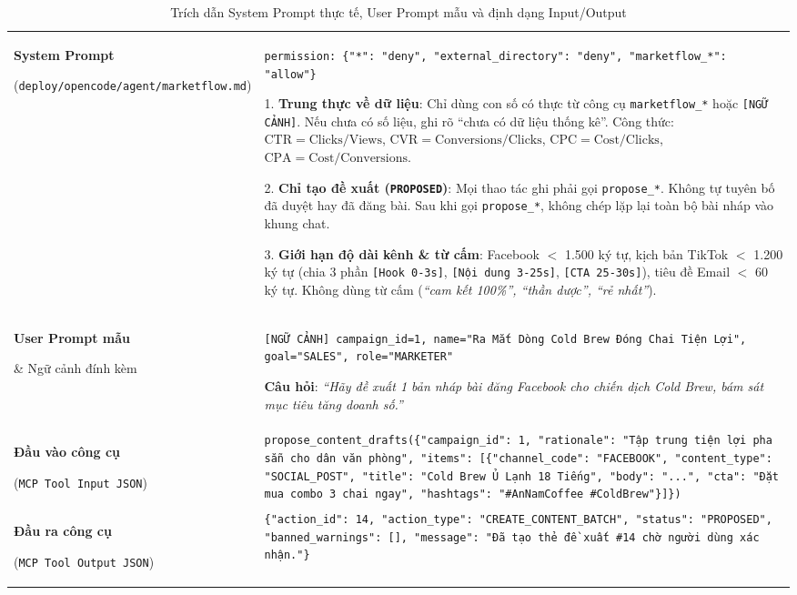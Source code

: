 \begin{table}[!htbp]
\centering
\scriptsize
\renewcommand{\arraystretch}{1.03}
\caption{Trích dẫn System Prompt thực tế, User Prompt mẫu và định dạng Input/Output}
\label{tab:prompt-io-spec}
\begin{tabularx}{\textwidth}{|L{2.9cm}|Y|}
\hline
{} & \\
\hline
\textbf{System Prompt}\par (\texttt{deploy/opencode/\allowbreak agent/marketflow.md}) &
\texttt{permission: \{"*": "deny", "external\_directory": "deny", "marketflow\_*": "allow"\}}\par
1. \textbf{Trung thực về dữ liệu}: Chỉ dùng con số có thực từ công cụ \texttt{marketflow\_*} hoặc \texttt{[NGỮ CẢNH]}. Nếu chưa có số liệu, ghi rõ ``chưa có dữ liệu thống kê''. Công thức: $\text{CTR}=\text{Clicks}/\text{Views}$, $\text{CVR}=\text{Conversions}/\text{Clicks}$, $\text{CPC}=\text{Cost}/\text{Clicks}$, $\text{CPA}=\text{Cost}/\text{Conversions}$.\par
2. \textbf{Chỉ tạo đề xuất (\texttt{PROPOSED})}: Mọi thao tác ghi phải gọi \texttt{propose\_*}. Không tự tuyên bố đã duyệt hay đã đăng bài. Sau khi gọi \texttt{propose\_*}, không chép lặp lại toàn bộ bài nháp vào khung chat.\par
3. \textbf{Giới hạn độ dài kênh \& từ cấm}: Facebook $<$ 1.500 ký tự, kịch bản TikTok $<$ 1.200 ký tự (chia 3 phần \texttt{[Hook 0-3s]}, \texttt{[Nội dung 3-25s]}, \texttt{[CTA 25-30s]}), tiêu đề Email $<$ 60 ký tự. Không dùng từ cấm (\textit{``cam kết 100\%'', ``thần dược'', ``rẻ nhất''}).\\
\hline
\textbf{User Prompt mẫu}\par \& Ngữ cảnh đính kèm &
\texttt{[NGỮ CẢNH] campaign\_id=1, name="Ra Mắt Dòng Cold Brew Đóng Chai Tiện Lợi", goal="SALES", role="MARKETER"}\par
\textbf{Câu hỏi}: \textit{``Hãy đề xuất 1 bản nháp bài đăng Facebook cho chiến dịch Cold Brew, bám sát mục tiêu tăng doanh số.''}\\
\hline
\textbf{Đầu vào công cụ}\par (\texttt{MCP Tool Input JSON}) &
\texttt{propose\_content\_drafts(\{"campaign\_id": 1, "rationale": "Tập trung tiện lợi pha sẵn cho dân văn phòng", "items": [\{"channel\_code": "FACEBOOK", "content\_type": "SOCIAL\_POST", "title": "Cold Brew Ủ Lạnh 18 Tiếng", "body": "...", "cta": "Đặt mua combo 3 chai ngay", "hashtags": "\#AnNamCoffee \#ColdBrew"\}]\})}\\
\hline
\textbf{Đầu ra công cụ}\par (\texttt{MCP Tool Output JSON}) &
\texttt{\{"action\_id": 14, "action\_type": "CREATE\_CONTENT\_BATCH", "status": "PROPOSED", "banned\_warnings": [], "message": "Đã tạo thẻ đề xuất \#14 chờ người dùng xác nhận."\}}\\
\hline
\end{tabularx}
\end{table}

